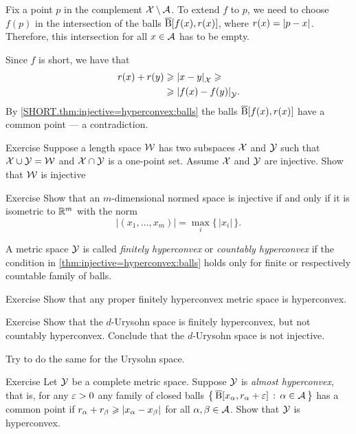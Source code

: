 Fix a point $p$ in the complement $\mathcal{X}\setminus \mathcal{A}$.
To extend $f$ to $p$, we need to choose $f(p)$ in the intersection of the balls 
$\overline{\mathrm{B}}{}[f(x),r(x)]$, where $r(x)=\dist{p}{x}{}$.
Therefore, this intersection for all $x\in \mathcal{A}$ has to be empty.

Since $f$ is short, we have that 
\begin{align*}
r(x)+r(y)&\ge \dist{x}{y}{\spc{X}}\ge
\\
&\ge \dist{f(x)}{f(y)}{\spc{Y}}.
\end{align*}
By \ref{SHORT.thm:injective=hyperconvex:balls} the balls 
$\overline{\mathrm{B}}{}[f(x),r(x)]$ have a common point --- a contradiction. 
\qeds

\begin{thm}{Exercise}\label{ex:one-point-gluing}
Suppose a length space $\mathcal{W}$ has two subspaces $\mathcal{X}$ and $\mathcal{Y}$ such that $\mathcal{X}\cup\mathcal{Y}=\mathcal{W}$ and $\mathcal{X}\cap\mathcal{Y}$ is a one-point set.
Assume $\mathcal{X}$ and $\mathcal{Y}$ are injective.
Show that  $\mathcal{W}$ is injective
\end{thm}

\begin{thm}{Exercise}\label{ex:Rm-ell-infty}
Show that an $m$-dimensional normed space is injective if and only if it is isometric to $\mathbb{R}^m$ with the norm
\[|(x_1,\dots,x_m)|=\max_i\{\,|x_i|\,\}.\]
\end{thm}

A metric space $\mathcal{Y}$ is called \emph{finitely hyperconvex} or \emph{countably hyperconvex} if the condition in \ref{thm:injective=hyperconvex:balls} holds only for finite or respectively countable family of balls.

\begin{thm}{Exercise}\label{ex:compact-hyperconvex}
Show that any proper finitely hyperconvex metric space is hyperconvex.
\end{thm}


\begin{thm}{Exercise}\label{ex:urysohn-hyperconvex}
Show that the $d$-Urysohn space is finitely hyperconvex, but not countably hyperconvex.
Conclude that the $d$-Urysohn space is not injective.

Try to do the same for the Urysohn space.
\end{thm}

\begin{thm}{Exercise}\label{ex:almost-hyperconvex}
Let $\mathcal{Y}$ be a complete metric space.
Suppose $\mathcal{Y}$ is \emph{almost hyperconvex},
that is, for any $\varepsilon>0$ any family of closed balls $\left\{\,{\overline{\mathrm{B}}{}[x_\alpha,r_\alpha+\varepsilon]}\,:\,{\alpha\in\mathcal{A}}\,\right\}$ has a common point if 
$r_\alpha+r_\beta\ge \dist{x_\alpha}{x_\beta}{}$ for all $\alpha,\beta\in \mathcal{A}$.
Show that $\mathcal{Y}$ is hyperconvex.
\end{thm}


